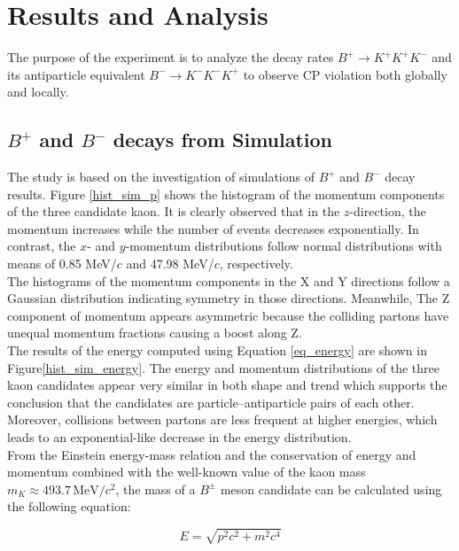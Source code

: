 \chapter{Results and Analysis}
    The purpose of the experiment is to analyze the decay rates \( B^+ \to K^+ K^+ K^- \) and its antiparticle equivalent \( B^- \to K^- K^- K^+ \) to observe CP violation both globally and locally.

    \section{\(B^+\) and  \(B^-\) decays from Simulation}

    The study is based on the investigation of simulations of \(B^+\) and \(B^-\) decay results. Figure \ref{hist_sim_p} shows the histogram of the momentum components of the three candidate kaon. It is clearly observed that in the \(z\)-direction, the momentum increases while the number of events decreases exponentially. In contrast, the \(x\)- and \(y\)-momentum distributions follow normal distributions with means of 0.85 MeV/\(c\) and 47.98 MeV/\(c\), respectively.
    \\ 

    The histograms of the momentum components in the X and Y directions follow a Gaussian distribution indicating symmetry in those directions. Meanwhile, The Z component of momentum appears asymmetric because the colliding partons have unequal momentum fractions causing a boost along Z.
    \\

    The results of the energy computed using Equation \ref{eq_energy} are shown in Figure\ref{hist_sim_energy}. The energy and momentum distributions of the three kaon candidates appear very similar in both shape and trend which supports the conclusion that the candidates are particle–antiparticle pairs of each other. Moreover, collisions between partons are less frequent at higher energies, which leads to an exponential-like decrease in the energy distribution.
    \\
    
    From the Einstein energy-mass relation and the conservation of energy and momentum combined with the well-known value of the kaon mass \(m_K \approx 493.7\,\mathrm{MeV}/c^2\), the mass of a \(B^\pm\) meson candidate can be calculated using the following equation:

    \begin{equation}
        E = \sqrt{p^2c^2 + m^2c^4}
    \label{eq_energy}
    \end{equation}

